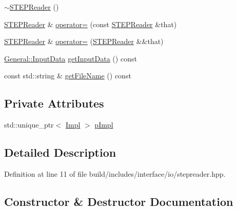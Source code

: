 \begin{DoxyCompactItemize}
\item 
\hyperlink{classMcCAD_1_1IO_1_1STEPReader_a7c17878fa8612e112c010f71ce24b887}{$\sim$\+S\+T\+E\+P\+Reader} ()
\item 
\hyperlink{classMcCAD_1_1IO_1_1STEPReader}{S\+T\+E\+P\+Reader} \& \hyperlink{classMcCAD_1_1IO_1_1STEPReader_a76364e997a7f0dfaaede72feeb358485}{operator=} (const \hyperlink{classMcCAD_1_1IO_1_1STEPReader}{S\+T\+E\+P\+Reader} \&that)
\item 
\hyperlink{classMcCAD_1_1IO_1_1STEPReader}{S\+T\+E\+P\+Reader} \& \hyperlink{classMcCAD_1_1IO_1_1STEPReader_af3fbf37e7a0d30577aee40c2a3f3ccdb}{operator=} (\hyperlink{classMcCAD_1_1IO_1_1STEPReader}{S\+T\+E\+P\+Reader} \&\&that)
\item 
\hyperlink{classMcCAD_1_1General_1_1InputData}{General\+::\+Input\+Data} \hyperlink{classMcCAD_1_1IO_1_1STEPReader_ae9670930a1309ec29c1c030204e4cbf4}{get\+Input\+Data} () const
\item 
const std\+::string \& \hyperlink{classMcCAD_1_1IO_1_1STEPReader_aaa4ac38a0a91a584ff6d882950a44a33}{get\+File\+Name} () const
\end{DoxyCompactItemize}
\subsection*{Private Attributes}
\begin{DoxyCompactItemize}
\item 
std\+::unique\+\_\+ptr$<$ \hyperlink{classMcCAD_1_1IO_1_1STEPReader_1_1Impl}{Impl} $>$ \hyperlink{classMcCAD_1_1IO_1_1STEPReader_a3bbb72987d6bad33c403c85401c62160}{p\+Impl}
\end{DoxyCompactItemize}


\subsection{Detailed Description}


Definition at line 11 of file build/includes/interface/io/stepreader.\+hpp.



\subsection{Constructor \& Destructor Documentation}
\mbox{\label{classMcCAD_1_1IO_1_1STEPReader_aa6ca64ed74bc7c6fcf079c3742de34eb}} 

